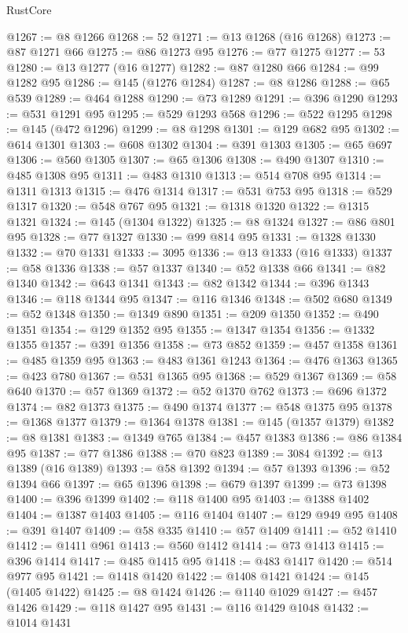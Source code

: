 \begin{lexlean}{RustCore}
\begin{coremodule}
@1267 := @8 @1266
@1268 := 52
@1271 := @13 @1268 (@16 @1268)
@1273 := @87 @1271 @66
@1275 := @86 @1273 @95
@1276 := @77 @1275
@1277 := 53
@1280 := @13 @1277 (@16 @1277)
@1282 := @87 @1280 @66
@1284 := @99 @1282 @95
@1286 := @145 (@1276 @1284)
@1287 := @8 @1286
@1288 := @65 @539
@1289 := @464 @1288
@1290 := @73 @1289
@1291 := @396 @1290
@1293 := @531 @1291 @95
@1295 := @529 @1293 @568
@1296 := @522 @1295
@1298 := @145 (@472 @1296)
@1299 := @8 @1298
@1301 := @129 @682 @95
@1302 := @614 @1301
@1303 := @608 @1302
@1304 := @391 @1303
@1305 := @65 @697
@1306 := @560 @1305
@1307 := @65 @1306
@1308 := @490 @1307
@1310 := @485 @1308 @95
@1311 := @483 @1310
@1313 := @514 @708 @95
@1314 := @1311 @1313
@1315 := @476 @1314
@1317 := @531 @753 @95
@1318 := @529 @1317
@1320 := @548 @767 @95
@1321 := @1318 @1320
@1322 := @1315 @1321
@1324 := @145 (@1304 @1322)
@1325 := @8 @1324
@1327 := @86 @801 @95
@1328 := @77 @1327
@1330 := @99 @814 @95
@1331 := @1328 @1330
@1332 := @70 @1331
@1333 := 3095
@1336 := @13 @1333 (@16 @1333)
@1337 := @58 @1336
@1338 := @57 @1337
@1340 := @52 @1338 @66
@1341 := @82 @1340
@1342 := @643 @1341
@1343 := @82 @1342
@1344 := @396 @1343
@1346 := @118 @1344 @95
@1347 := @116 @1346
@1348 := @502 @680
@1349 := @52 @1348
@1350 := @1349 @890
@1351 := @209 @1350
@1352 := @490 @1351
@1354 := @129 @1352 @95
@1355 := @1347 @1354
@1356 := @1332 @1355
@1357 := @391 @1356
@1358 := @73 @852
@1359 := @457 @1358
@1361 := @485 @1359 @95
@1363 := @483 @1361 @1243
@1364 := @476 @1363
@1365 := @423 @780
@1367 := @531 @1365 @95
@1368 := @529 @1367
@1369 := @58 @640
@1370 := @57 @1369
@1372 := @52 @1370 @762
@1373 := @696 @1372
@1374 := @82 @1373
@1375 := @490 @1374
@1377 := @548 @1375 @95
@1378 := @1368 @1377
@1379 := @1364 @1378
@1381 := @145 (@1357 @1379)
@1382 := @8 @1381
@1383 := @1349 @765
@1384 := @457 @1383
@1386 := @86 @1384 @95
@1387 := @77 @1386
@1388 := @70 @823
@1389 := 3084
@1392 := @13 @1389 (@16 @1389)
@1393 := @58 @1392
@1394 := @57 @1393
@1396 := @52 @1394 @66
@1397 := @65 @1396
@1398 := @679 @1397
@1399 := @73 @1398
@1400 := @396 @1399
@1402 := @118 @1400 @95
@1403 := @1388 @1402
@1404 := @1387 @1403
@1405 := @116 @1404
@1407 := @129 @949 @95
@1408 := @391 @1407
@1409 := @58 @335
@1410 := @57 @1409
@1411 := @52 @1410
@1412 := @1411 @961
@1413 := @560 @1412
@1414 := @73 @1413
@1415 := @396 @1414
@1417 := @485 @1415 @95
@1418 := @483 @1417
@1420 := @514 @977 @95
@1421 := @1418 @1420
@1422 := @1408 @1421
@1424 := @145 (@1405 @1422)
@1425 := @8 @1424
@1426 := @1140 @1029
@1427 := @457 @1426
@1429 := @118 @1427 @95
@1431 := @116 @1429 @1048
@1432 := @1014 @1431

\end{coremodule}
\end{lexlean}
